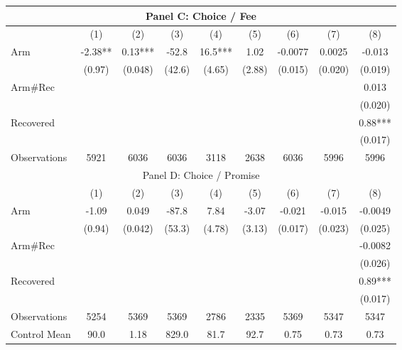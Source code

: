 \begin{tabular}{lcccccccc}
\multicolumn{9}{c}{Panel C: Choice / Fee} \\
\midrule
\midrule
      & (1)   & (2)   & (3)   & (4)   & (5)   & (6)   & (7)   & (8) \\
\midrule
\midrule
Arm   & -2.38** & 0.13*** & -52.8 & 16.5*** & 1.02  & -0.0077 & 0.0025 & -0.013 \\
      & (0.97) & (0.048) & (42.6) & (4.65) & (2.88) & (0.015) & (0.020) & (0.019) \\
Arm\#Rec &       &       &       &       &       &       &       & 0.013 \\
      &       &       &       &       &       &       &       & (0.020) \\
Recovered &       &       &       &       &       &       &       & 0.88*** \\
      &       &       &       &       &       &       &       & (0.017) \\
\midrule
Observations & 5921  & 6036  & 6036  & 3118  & 2638  & 6036  & 5996  & 5996 \\
\midrule
\multicolumn{9}{c}{Panel D: Choice / Promise} \\
\midrule
\midrule
      & (1)   & (2)   & (3)   & (4)   & (5)   & (6)   & (7)   & (8) \\
\midrule
\midrule
Arm   & -1.09 & 0.049 & -87.8 & 7.84  & -3.07 & -0.021 & -0.015 & -0.0049 \\
      & (0.94) & (0.042) & (53.3) & (4.78) & (3.13) & (0.017) & (0.023) & (0.025) \\
Arm\#Rec &       &       &       &       &       &       &       & -0.0082 \\
      &       &       &       &       &       &       &       & (0.026) \\
Recovered &       &       &       &       &       &       &       & 0.89*** \\
      &       &       &       &       &       &       &       & (0.017) \\
\midrule
Observations & 5254  & 5369  & 5369  & 2786  & 2335  & 5369  & 5347  & 5347 \\
\midrule
\midrule
Control Mean & 90.0  & 1.18  & 829.0 & 81.7  & 92.7  & 0.75  & 0.73  & 0.73 \\
\bottomrule
\bottomrule
\end{tabular}%
